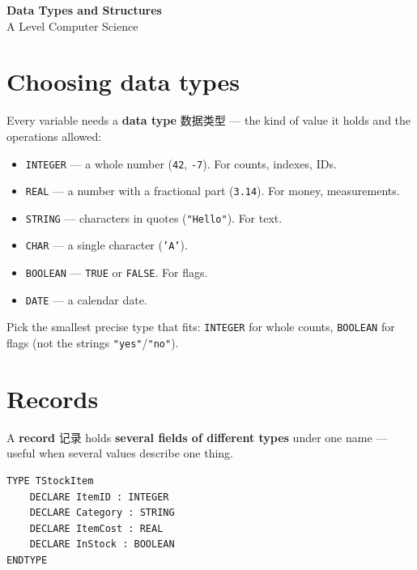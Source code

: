 \documentclass[11pt]{article}
\begin{document}
\begin{center}
  {\LARGE\bfseries Data Types and Structures}\\[0.35em]
  {\large A Level Computer Science}
\end{center}
\vspace{0.6em}

\section*{Choosing data types}

Every variable needs a \textbf{data type} 数据类型 — the kind of value it holds and the operations allowed:

\begin{itemize}
\item \texttt{INTEGER} — a whole number (\texttt{42}, \texttt{-7}). For counts, indexes, IDs.

\item \texttt{REAL} — a number with a fractional part (\texttt{3.14}). For money, measurements.

\item \texttt{STRING} — characters in quotes (\texttt{"Hello"}). For text.

\item \texttt{CHAR} — a single character (\texttt{'A'}).

\item \texttt{BOOLEAN} — \texttt{TRUE} or \texttt{FALSE}. For flags.

\item \texttt{DATE} — a calendar date.

\end{itemize}

Pick the smallest precise type that fits: \texttt{INTEGER} for whole counts, \texttt{BOOLEAN} for flags (not the strings \texttt{"yes"}/\texttt{"no"}).

\section*{Records}

A \textbf{record} 记录 holds \textbf{several fields of different types} under one name — useful when several values describe one thing.

\begin{Verbatim}
TYPE TStockItem
    DECLARE ItemID : INTEGER
    DECLARE Category : STRING
    DECLARE ItemCost : REAL
    DECLARE InStock : BOOLEAN
ENDTYPE
\end{Verbatim}
\end{document}
